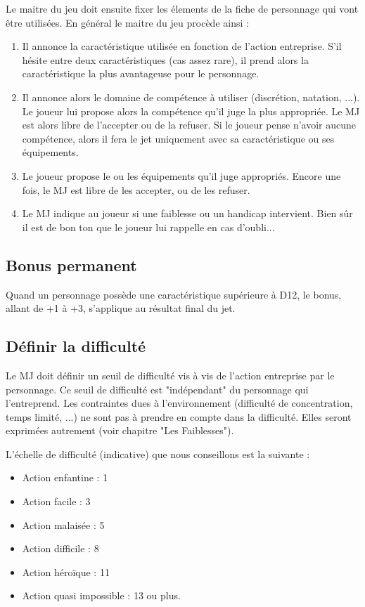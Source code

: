 \begin{multicols}{2}
Le maitre du jeu doit ensuite fixer les élements de la fiche de personnage qui vont être utilisées. En général le maitre du jeu procède ainsi :

\begin{enumerate}
\item Il annonce la caractéristique utilisée en fonction de l'action entreprise. S'il hésite entre deux caractéristiques (cas assez rare), il prend alors la caractéristique la plus avantageuse pour le personnage.
\item Il annonce alors le domaine de compétence à utiliser (discrétion, natation, ...). Le joueur lui propose alors la compétence qu'il juge la plus appropriée. Le MJ est alors libre de l'accepter ou de la refuser. Si le joueur pense n'avoir aucune compétence, alors il fera le jet uniquement avec sa caractéristique ou ses équipements.
\item Le joueur propose le ou les équipements qu'il juge appropriés. Encore une fois, le MJ est libre de les accepter, ou de les refuser.
\item Le MJ indique au joueur si une faiblesse ou un handicap intervient. Bien sûr il est de bon ton que le joueur lui rappelle en cas d'oubli...
\end{enumerate}

\subsection{Bonus permanent}

Quand un personnage possède une caractéristique supérieure à D12, le bonus, allant de +1 à +3, s'applique au résultat final du jet.

\subsection{Définir la difficulté}

Le MJ doit définir un seuil de difficulté vis à vis de l'action entreprise par le personnage. Ce seuil de difficulté est "indépendant" du personnage qui l'entreprend. Les contraintes dues à l'environnement (difficulté de concentration, temps limité, ...) ne sont pas à prendre en compte dans la difficulté. Elles seront exprimées autrement (voir chapitre "Les Faiblesses").

L'échelle de difficulté (indicative) que nous conseillons est la suivante :

\begin{itemize}
\item Action enfantine : 1
\item Action facile : 3
\item Action malaisée : 5
\item Action difficile : 8
\item Action héroïque : 11
\item Action quasi impossible : 13 ou plus.
\end{itemize}


\end{multicols}

